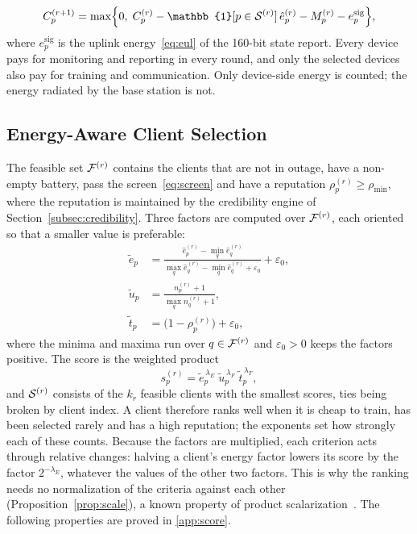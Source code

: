 \begin{equation}
	C_p^{(r+1)}=\max\Bigl\{0,\;C_p^{(r)}-\mathbb{1}[p\in\cS^{(r)}]\,\hat e_p^{(r)}-M_p^{(r)}-e_p^{\mathrm{sig}}\Bigr\},
	\label{eq:battery}
\end{equation}
where $e_p^{\mathrm{sig}}$ is the uplink energy~\eqref{eq:eul} of the 160-bit state report. Every device pays for monitoring and reporting in every round, and only the selected devices also pay for training and communication. Only device-side energy is counted; the energy radiated by the base station is not.

\subsection{Energy-Aware Client Selection}
\label{subsec:score}
The feasible set $\mathcal{F}^{(r)}$ contains the clients that are not in outage, have a non-empty battery, pass the screen~\eqref{eq:screen} and have a reputation $\rho_p^{(r)}\ge\rho_{\min}$, where the reputation is maintained by the credibility engine of Section~\ref{subsec:credibility}. Three factors are computed over $\mathcal{F}^{(r)}$, each oriented so that a smaller value is preferable:
\begin{align}
	\tilde e_p&=\frac{\hat e_p^{(r)}-\min_{q}\hat e_q^{(r)}}{\max_{q}\hat e_q^{(r)}-\min_{q}\hat e_q^{(r)}+\varepsilon_0}+\varepsilon_0, \label{eq:efactor}\\
	\tilde u_p&=\frac{n_p^{(r)}+1}{\max_{q}n_q^{(r)}+1}, \label{eq:ufactor}\\
	\tilde t_p&=\bigl(1-\rho_p^{(r)}\bigr)+\varepsilon_0, \label{eq:tfactor}
\end{align}
where the minima and maxima run over $q\in\mathcal{F}^{(r)}$ and $\varepsilon_0>0$ keeps the factors positive. The score is the weighted product
\begin{equation}
	s_p^{(r)}=\tilde e_p^{\,\lambda_E}\;\tilde u_p^{\,\lambda_F}\;\tilde t_p^{\,\lambda_T},
	\label{eq:score}
\end{equation}
and $\mathcal{S}^{(r)}$ consists of the $k_r$ feasible clients with the smallest scores, ties being broken by client index. A client therefore ranks well when it is cheap to train, has been selected rarely and has a high reputation; the exponents set how strongly each of these counts. Because the factors are multiplied, each criterion acts through relative changes: halving a client's energy factor lowers its score by the factor $2^{-\lambda_E}$, whatever the values of the other two factors. This is why the ranking needs no normalization of the criteria against each other (Proposition~\ref{prop:scale}), a known property of product scalarization~\cite{marler2004survey}. The following properties are proved in \ref{app:score}.

